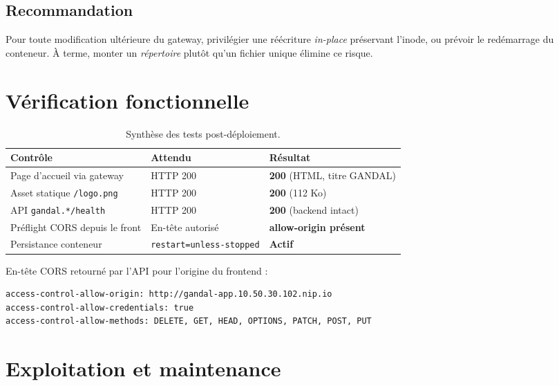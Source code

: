 \documentclass[11pt,a4paper]{article}
\newcommand{\statut}[1]{\textcolor{okgreen}{\textbf{#1}}}
\begin{document}
\subsection{Recommandation}
Pour toute modification ultérieure du gateway, privilégier une réécriture
\emph{in-place} préservant l'inode, ou prévoir le redémarrage du conteneur. À terme,
monter un \emph{répertoire} plutôt qu'un fichier unique élimine ce risque.

\section{Vérification fonctionnelle}

\begin{table}[h]
\centering
\renewcommand{\arraystretch}{1.35}
\begin{tabularx}{\linewidth}{@{}Xll@{}}
\toprule
\textbf{Contrôle} & \textbf{Attendu} & \textbf{Résultat} \\
\midrule
Page d'accueil via gateway & HTTP 200 & \statut{200} (HTML, titre GANDAL) \\
Asset statique \texttt{/logo.png} & HTTP 200 & \statut{200} (112 Ko) \\
API \texttt{gandal.*/health} & HTTP 200 & \statut{200} (backend intact) \\
Préflight CORS depuis le front & En-tête autorisé & \statut{allow-origin présent} \\
Persistance conteneur & \texttt{restart=unless-stopped} & \statut{Actif} \\
\bottomrule
\end{tabularx}
\caption{Synthèse des tests post-déploiement.}
\end{table}

\noindent En-tête CORS retourné par l'API pour l'origine du frontend :
\begin{lstlisting}[language=bash]
access-control-allow-origin: http://gandal-app.10.50.30.102.nip.io
access-control-allow-credentials: true
access-control-allow-methods: DELETE, GET, HEAD, OPTIONS, PATCH, POST, PUT
\end{lstlisting}

\section{Exploitation et maintenance}
\end{document}
